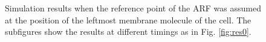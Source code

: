 \documentclass[a4paper,12pt, oneside]{book}
\begin{document}
\begin{figure}[tbp]
 \caption{Simulation results when the reference point of the ARF was  assumed at  the position of the leftmost membrane molecule of the cell. The subfigures show the results at different timings as in Fig. \ref{fig:res0}.}
 \label{fig:res2}
\end{figure}

\end{document}
